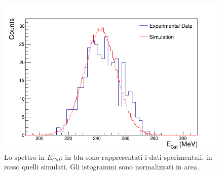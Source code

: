 \begin{figure} [!p]
	\centering
	\includegraphics[width=\textwidth, keepaspectratio]{Grafici_Tesi/Test/spettro_csi_normArea.png}
	\caption{Lo spettro in $E_{CsI}$: in blu sono rappresentati i dati sperimentali, in rosso quelli simulati. Gli istogrammi sono normalizzati in area.} \label{fig:spettro_csi_simul}
\end{figure}


